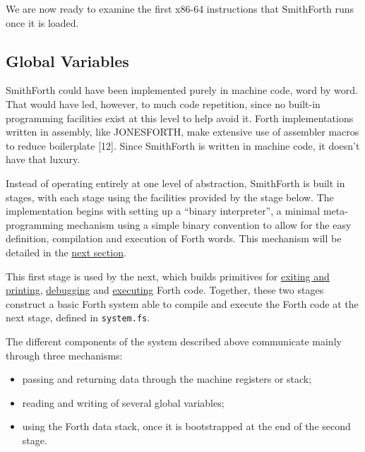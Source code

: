 \documentclass[a4paper,12pt,final]{article}
\makeatletter
\newcommand{\citeprocitem}[2]{\hyper@linkstart{cite}{citeproc_bib_item_#1}#2\hyper@linkend}
\makeatother
\begin{document}
\begin{table}[!htbp]
\begin{adjustwidth}{-1cm}{-1cm}
\begin{center}
\end{center}
\normalsize \end{adjustwidth} \end{table} \vspace{0}

We are now ready to examine the first x86-64 instructions that
SmithForth runs once it is loaded.
\clearpage


\subsection{Global Variables}
\label{sec:orga026473}

SmithForth could have been implemented purely in machine code, word by
word.  That would have led, however, to much code repetition, since no
built-in programming facilities exist at this level to help avoid it.
Forth implementations written in assembly, like JONESFORTH, make
extensive use of assembler macros to reduce boilerplate
\citeprocitem{12}{[12]}.  Since SmithForth is written in machine code, it
doesn't have that luxury.

Instead of operating entirely at one level of abstraction, SmithForth
is built in stages, with each stage using the facilities provided by
the stage below.  The implementation begins with setting up a ``binary
interpreter'', a minimal meta-programming mechanism using a simple
binary convention to allow for the easy definition, compilation and
execution of Forth words.  This mechanism will be detailed in the \hyperref[sec:org1a2f8d5]{next
section}.

This first stage is used by the next, which builds primitives for
\hyperref[sec:org4ce6d13]{exiting and printing}, \hyperref[sec:org93c7bb6]{debugging} and \hyperref[sec:org779e83c]{executing} Forth code. Together,
these two stages construct a basic Forth system able to compile and
execute the Forth code at the next stage, defined in \texttt{system.fs}.

The different components of the system described above communicate
mainly through three mechanisms:
\begin{itemize}
\item passing and returning data through the machine registers or stack;
\item reading and writing of several global variables;
\item using the Forth data stack, once it is bootstrapped at the end of
the second stage.
\end{itemize}
\end{document}
